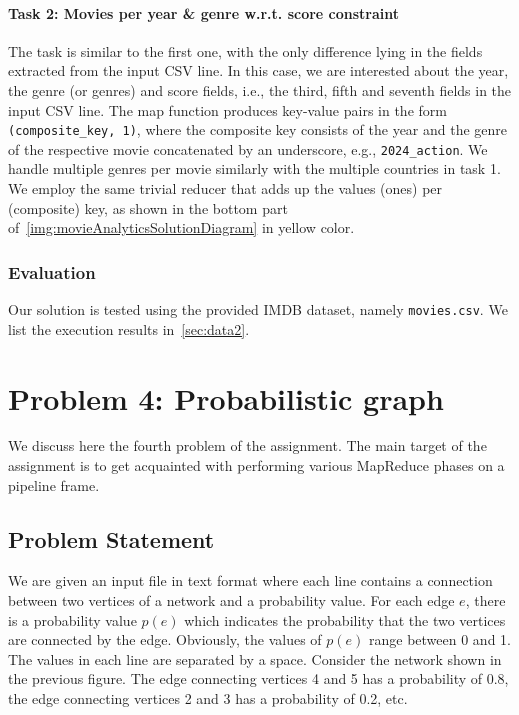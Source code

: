 \documentclass[acmlarge]{acmart}
\begin{document}
\paragraph{Task 2: Movies per year \& genre w.r.t. score constraint} The task is similar to the first one, with the only difference lying in the fields extracted from the input CSV line. In this case, we are interested about the year, the genre (or genres) and score fields, i.e., the third, fifth and seventh fields in the input CSV line. The map function produces key-value pairs in the form \texttt{(composite\_key, 1)}, where the composite key consists of the year and the genre of the respective movie concatenated by an underscore, e.g., \texttt{2024\_action}. We handle multiple genres per movie similarly with the multiple countries in task 1. We employ the same trivial reducer that adds up the values (ones) per (composite) key, as shown in the bottom part of~\autoref{img:movieAnalyticsSolutionDiagram} in yellow color.

\subsubsection{Evaluation} Our solution is tested using the provided IMDB dataset, namely \texttt{movies.csv}. We list the execution results in~\autoref{sec:data2}.

\section{Problem 4: Probabilistic graph}
\label{sec:problem4}
We discuss here the fourth problem of the assignment.
The main target of the assignment is to get acquainted with performing various MapReduce phases on a pipeline frame.

\subsection{Problem Statement}
We are given an input file in text format where each line contains a connection between two vertices of a network and a
probability value.
For each edge \( e \), there is a probability value \( p(e) \) which indicates the probability that the two vertices are
connected by the edge.
Obviously, the values of \( p(e) \) range between 0 and 1.
The values in each line are separated by a space.
Consider the network shown in the previous figure.
The edge connecting vertices 4 and 5 has a probability of
0.8, the edge connecting vertices 2 and 3 has a probability of 0.2, etc.
\end{document}
